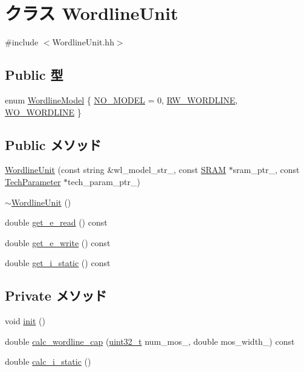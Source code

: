 \hypertarget{classWordlineUnit}{
\section{クラス WordlineUnit}
\label{classWordlineUnit}
}


{\ttfamily \#include $<$WordlineUnit.hh$>$}\subsection*{Public 型}
\begin{DoxyCompactItemize}
\item 
enum \hyperlink{classWordlineUnit_a986b9436bb01df2bc9d725db0935e836}{WordlineModel} \{ \hyperlink{classWordlineUnit_a986b9436bb01df2bc9d725db0935e836abab57b6e2c553e4d983f415a1f4ea75b}{NO\_\-MODEL} =  0, 
\hyperlink{classWordlineUnit_a986b9436bb01df2bc9d725db0935e836a66fd52f2c4f2f5bd52672f30ad4931c9}{RW\_\-WORDLINE}, 
\hyperlink{classWordlineUnit_a986b9436bb01df2bc9d725db0935e836ab0ae36a0f6ff4f9b8c3e536e3cfbdfdd}{WO\_\-WORDLINE}
 \}
\end{DoxyCompactItemize}
\subsection*{Public メソッド}
\begin{DoxyCompactItemize}
\item 
\hyperlink{classWordlineUnit_a007bc361162be134cfe2984058f3acef}{WordlineUnit} (const string \&wl\_\-model\_\-str\_\-, const \hyperlink{classSRAM}{SRAM} $\ast$sram\_\-ptr\_\-, const \hyperlink{classTechParameter}{TechParameter} $\ast$tech\_\-param\_\-ptr\_\-)
\item 
\hyperlink{classWordlineUnit_a5044aff9e5837c5a7e9f6381ddaefe2e}{$\sim$WordlineUnit} ()
\item 
double \hyperlink{classWordlineUnit_ad2c407e628a0ef8df4eb995cf98a024f}{get\_\-e\_\-read} () const 
\item 
double \hyperlink{classWordlineUnit_aa57a22237e96a10db0f785555cb5bb3c}{get\_\-e\_\-write} () const 
\item 
double \hyperlink{classWordlineUnit_af4ce13e52cccc034f4f0bb0f0a6c9468}{get\_\-i\_\-static} () const 
\end{DoxyCompactItemize}
\subsection*{Private メソッド}
\begin{DoxyCompactItemize}
\item 
void \hyperlink{classWordlineUnit_a02fd73d861ef2e4aabb38c0c9ff82947}{init} ()
\item 
double \hyperlink{classWordlineUnit_ab84b49850d493b5151c5fc24bcd5826b}{calc\_\-wordline\_\-cap} (\hyperlink{Type_8hh_a435d1572bf3f880d55459d9805097f62}{uint32\_\-t} num\_\-mos\_\-, double mos\_\-width\_\-) const 
\item 
double \hyperlink{classWordlineUnit_a0027807356ac4ca07fe2e593234eb884}{calc\_\-i\_\-static} ()
\end{DoxyCompactItemize}
